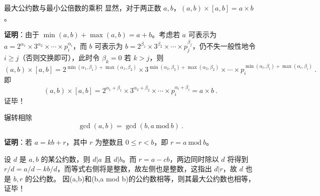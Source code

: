 \begin{theorem}{最大公约数与最小公倍数的乘积}
显然，对于两正数 $a, b$，$(a, b) \times [a, b] = a \times b$。
\end{theorem}
\textbf{证明}：由于 $\min(a, b) + \max(a, b) =a + b$。考虑若 $a$ 可表示为 $a = 2^{\alpha_1} \times 3^{\alpha_2} \times \cdots \times p_i^{\alpha_i}$，而 $b$ 可表示为 $b = 2^{\beta_1} \times 3^{\beta_2} \times \cdots \times p_j^{\beta_j}$，仍不失一般性地令 $i \ge j$（否则交换即可），此时令 $\beta_k = 0$ 若 $k > j$，则
\begin{equation}
(a, b) \times  [a, b] = 2^{\min(\alpha_1, \beta_1) + \max(\alpha_1, \beta_2)} \times 3^{\min(\alpha_2, \beta_2) + \max(\alpha_2, \beta_2)} \times \cdots \times p_i^{\min(\alpha_i, \beta_i) + \max(\alpha_i, \beta_i)} ~.
\end{equation}
即
\begin{equation}
(a,b) \times [a, b] = 2^{\alpha_1 + \beta_1} \times 3^{\alpha_2 + \beta_2} \times \cdots \times p_i^{\alpha_i + \beta_i} = a \times b ~.
\end{equation}
证毕！

\begin{theorem}{辗转相除}
\begin{equation}
\gcd(a, b) = \gcd(b , a~ \text{mod} ~b)  ~.
\end{equation}
\end{theorem}
\textbf{证明}：若 $a = kb + r$，其中 $r$ 为整数且 $0 \le r < b$，即 $r = a ~\text{mod}~ b$。

设 $d$ 是 $a, b$ 的某公约数，则 $d|a$ 且 $d|b$。而 $r = a - cb$，两边同时除以 $d$ 将得到 $r/d = a/d - kb/d$，而等式右侧将是整数，故左侧也是整数，这指出 $d | r$，故 $d$ 也是 $b, r$ 的公约数。
因(a,b)和(b,a mod b)的公约数相等，则其最大公约数也相等，证毕！
